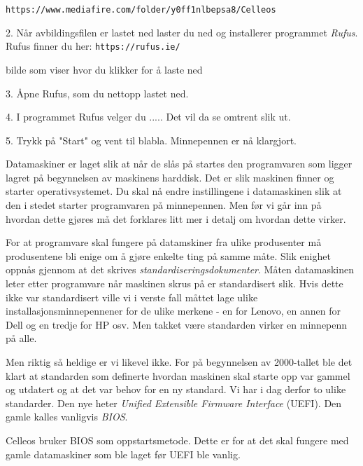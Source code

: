 \vskip 4pt

{\tt https://www.mediafire.com/folder/y0ff1nlbepsa8/Celleos}

\vskip 4pt

\item{2.} N\aa r avbildingsfilen er lastet ned laster du ned og installerer programmet {\it Rufus}. Rufus finner du her:
\vskip 4pt
{\tt https://rufus.ie/}

\centerline{
\epsfxsize 6cm
}

bilde som viser hvor du klikker for \aa{} laste ned
\item{3.} \AA pne Rufus, som du nettopp lastet ned.
\item{4.} I programmet Rufus velger du .....
Det vil da se omtrent slik ut.
\item{5.} Trykk p\aa{} "Start" og vent til blabla. Minnepennen er n\aa{} klargjort.


Datamaskiner er laget slik at n\aa r de sl\aa s p\aa{} startes den programvaren som ligger lagret p\aa{} begynnelsen av maskinens harddisk. Det er slik maskinen finner og starter operativsystemet. Du skal n\aa{} endre instillingene i datamaskinen slik at den i stedet starter programvaren p\aa{} minnepennen. Men f\o r vi g\aa r inn p\aa{} hvordan dette gj\o res m\aa{} det forklares litt mer i detalj om hvordan dette virker.

For at programvare skal fungere p\aa{} datamskiner fra ulike produsenter m\aa{} produsentene bli enige om  \aa{} gj\o re enkelte ting p\aa{} samme m\aa te. Slik enighet oppn\aa s gjennom at det skrives {\it standardiseringsdokumenter}. M\aa ten datamaskinen leter etter programvare n\aa r maskinen skrus p\aa{} er standardisert slik. Hvis dette ikke var standardisert ville vi i verste fall m\aa ttet lage ulike installasjonsminnepennener for de ulike merkene - en for Lenovo, en annen for Dell og  en tredje for HP osv. Men takket v\ae re standarden virker en minnepenn p\aa{} alle.

Men riktig s\aa{} heldige er vi likevel ikke. For p\aa{} begynnelsen av 2000-tallet ble det klart at standarden som definerte hvordan maskinen skal starte opp var gammel og utdatert og at det var behov for en ny standard. Vi har i dag derfor to ulike standarder. Den nye heter {\it Unified Extensible Firmware Interface} (UEFI). Den gamle kalles vanligvis {\it BIOS}. 

Celleos bruker BIOS som oppstartsmetode. Dette er for at det skal fungere med gamle datamaskiner som ble laget f\o r UEFI ble vanlig. 

